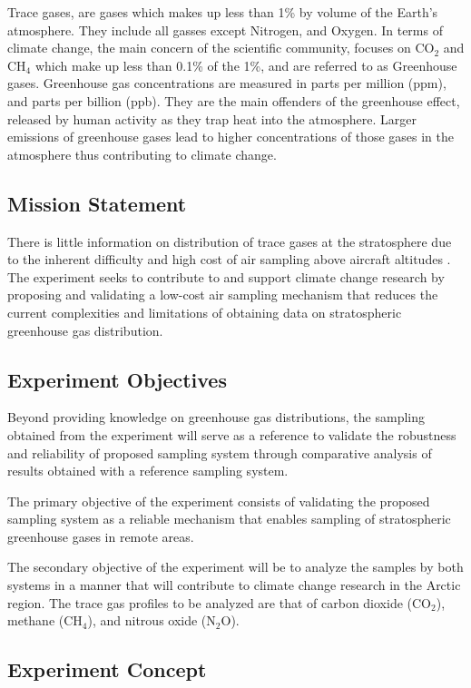\documentclass[a4paper,12pt,twoside]{article}
\begin{document}
Trace gases, are gases which makes up less than 1\% by volume of the Earth's atmosphere. They include all gasses except Nitrogen, and Oxygen. In terms of climate change, the main concern of the scientific community, focuses on CO$_2$ and CH$_4$ which make up less than 0.1\% of the 1\%, and are referred to as Greenhouse gases. Greenhouse gas concentrations are measured in parts per million (ppm), and parts per billion (ppb). They are the main offenders of the greenhouse effect, released by human activity as they trap heat into the atmosphere. Larger emissions of greenhouse gases lead to higher concentrations of those gases in the atmosphere thus contributing to climate change.

\subsection{Mission Statement}

There is little information on distribution of trace gases at the stratosphere due to the inherent difficulty and high cost of air sampling above aircraft altitudes \cite{Trace}. The experiment seeks to contribute to and support climate change research by proposing and validating a low-cost air sampling mechanism that reduces the current complexities and limitations of obtaining data on stratospheric greenhouse gas distribution.
\pagebreak
\subsection{Experiment Objectives}

Beyond providing knowledge on greenhouse gas distributions, the sampling obtained from the experiment will serve as a reference to validate the robustness and reliability of proposed sampling system through comparative analysis of results obtained with a reference sampling system.

The primary objective of the experiment consists of validating the proposed sampling system as a reliable mechanism that enables sampling of stratospheric greenhouse gases in remote areas.

The secondary objective of the experiment will be to analyze the samples by both systems in a manner that will contribute to climate change research in the Arctic region. The trace gas profiles to be analyzed are that of carbon dioxide (CO$_{2}$), methane (CH$_{4}$), and nitrous oxide (N$_{2}$O). 
\subsection{Experiment Concept}
\end{document}
